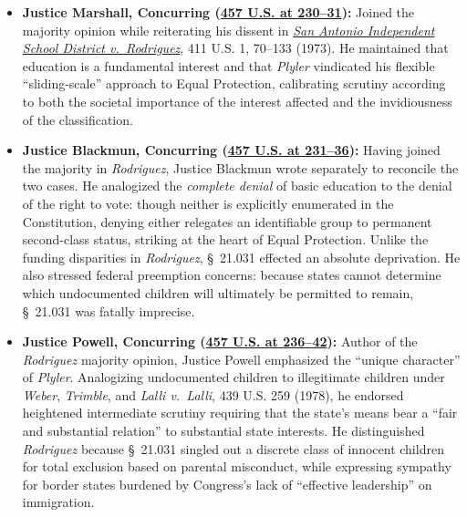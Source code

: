 \documentclass[12pt]{article}
\begin{document}
\begin{itemize}
    \item \textbf{Justice Marshall, Concurring (\href{https://www.law.cornell.edu/supremecourt/text/457/202}{457 U.S. at 230--31}):} Joined the majority opinion while reiterating his dissent in \href{https://supreme.justia.com/cases/federal/us/411/1/}{\textit{San Antonio Independent School District v.\ Rodriguez}}, 411 U.S. 1, 70--133 (1973). He maintained that education is a fundamental interest and that \textit{Plyler} vindicated his flexible ``sliding-scale'' approach to Equal Protection, calibrating scrutiny according to both the societal importance of the interest affected and the invidiousness of the classification.
    \item \textbf{Justice Blackmun, Concurring (\href{https://www.law.cornell.edu/supremecourt/text/457/202}{457 U.S. at 231--36}):} Having joined the majority in \textit{Rodriguez}, Justice Blackmun wrote separately to reconcile the two cases. He analogized the \textit{complete denial} of basic education to the denial of the right to vote: though neither is explicitly enumerated in the Constitution, denying either relegates an identifiable group to permanent second-class status, striking at the heart of Equal Protection. Unlike the funding disparities in \textit{Rodriguez}, \S~21.031 effected an absolute deprivation. He also stressed federal preemption concerns: because states cannot determine which undocumented children will ultimately be permitted to remain, \S~21.031 was fatally imprecise.
    \item \textbf{Justice Powell, Concurring (\href{https://www.law.cornell.edu/supremecourt/text/457/202}{457 U.S. at 236--42}):} Author of the \textit{Rodriguez} majority opinion, Justice Powell emphasized the ``unique character'' of \textit{Plyler}. Analogizing undocumented children to illegitimate children under \textit{Weber}, \textit{Trimble}, and \textit{Lalli v.\ Lalli}, 439 U.S. 259 (1978), he endorsed heightened intermediate scrutiny requiring that the state's means bear a ``fair and substantial relation'' to substantial state interests. He distinguished \textit{Rodriguez} because \S~21.031 singled out a discrete class of innocent children for total exclusion based on parental misconduct, while expressing sympathy for border states burdened by Congress's lack of ``effective leadership'' on immigration.

\end{itemize}
\end{document}

